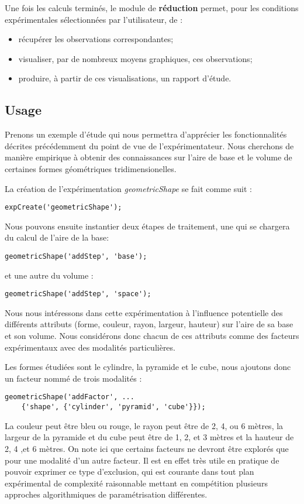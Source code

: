Une fois les calculs terminés, le module de \textbf{réduction} permet, pour les conditions expérimentales sélectionnées par l'utilisateur, de :
\begin{itemize}
  \item récupérer les observations correspondantes;
  \item visualiser, par de nombreux moyens graphiques, ces observations;
  \item produire, à partir de ces visualisations, un rapport d'étude.
\end{itemize}

\subsection{\nmu Usage}

Prenons un exemple d'étude qui nous permettra d'apprécier les fonctionnalités décrites précédemment du point de vue de l'expérimentateur. Nous cherchons de manière empirique à obtenir des connaissances sur l'aire de base et le volume de certaines formes géométriques tridimensionelles.

La création de l'expérimentation \textsl{geometricShape} se fait comme suit :
\begin{lstlisting}
expCreate('geometricShape');
\end{lstlisting}
Nous pouvons ensuite instantier deux étapes de traitement, une qui se chargera du calcul de l'aire de la base:
\begin{lstlisting}
geometricShape('addStep', 'base');
\end{lstlisting}
et une autre du volume :
\begin{lstlisting}
geometricShape('addStep', 'space');
\end{lstlisting}
Nous nous intéressons dans cette expérimentation à l'influence potentielle des différents attributs (forme, couleur, rayon, largeur, hauteur) sur l'aire de sa base et son volume. Nous considérons donc chacun de ces attributs comme des facteurs expérimentaux avec des modalités particulières.

Les formes étudiées sont le cylindre, la pyramide et le cube, nous ajoutons donc un facteur nommé  de trois modalités :
\begin{lstlisting}
geometricShape('addFactor', ...
	{'shape', {'cylinder', 'pyramid', 'cube'}});
\end{lstlisting}
La couleur peut être bleu ou rouge, le rayon peut être de 2, 4, ou 6 mètres, la largeur de la pyramide et du cube peut être de 1, 2, et 3 mètres et la hauteur de 2, 4 ,et 6 mètres. On note ici que certains facteurs ne devront être explorés que pour une modalité d'un autre facteur. Il est en effet très utile en pratique de pouvoir exprimer ce type d'exclusion, qui est courante dans tout plan expérimental de complexité raisonnable mettant en compétition plusieurs approches algorithmiques de paramétrisation différentes.

